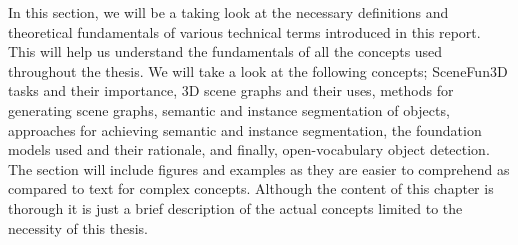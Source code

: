 In this section, we will be a taking look at the necessary definitions and theoretical fundamentals of various technical terms introduced in this report. 
This will help us understand the fundamentals of all the concepts used throughout the thesis. We will take a look at the following concepts; 
SceneFun3D tasks and their importance, 3D scene graphs and their uses, methods for generating scene graphs, semantic and instance segmentation of objects, 
approaches for achieving semantic and instance segmentation, the foundation models used and their rationale, and finally, open-vocabulary object detection.
The section will include figures and examples as they are easier to comprehend as compared to text for complex concepts. Although the content of this 
chapter is thorough it is just a brief description of the actual concepts limited to the necessity of this thesis.

